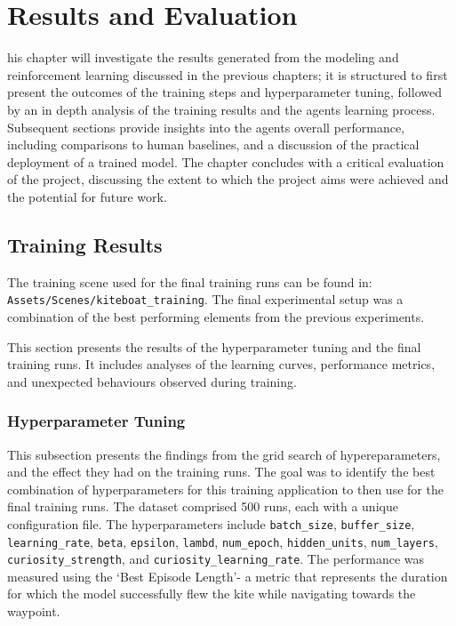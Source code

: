 

\let\textcircled=\pgftextcircled\chapter{Results and Evaluation}\label{chap:results}

his chapter will investigate the results generated from the modeling and reinforcement learning discussed in the previous chapters; it is structured to first present the outcomes of the training steps and hyperparameter tuning, followed by an in depth analysis of the training results and the agents learning process. Subsequent sections provide insights into the agents overall performance, including comparisons to human baselines, and a discussion of the practical deployment of a trained model. The chapter concludes with a critical evaluation of the project, discussing the extent to which the project aims were achieved and the potential for future work.


\section{Training Results}

The training scene used for the final training runs can be found in:
\newline
\texttt{Assets/Scenes/kiteboat\_training}. 
The final experimental setup was a combination of the best performing elements from the previous experiments.

This section presents the results of the hyperparameter tuning and the final training runs. It includes analyses of the learning curves, performance metrics, and unexpected behaviours observed during training.

\subsection{Hyperparameter Tuning}\label{sec:hyperparameter_tuning}

This subsection presents the findings from the grid search of hypereparameters, and the effect they had on the training runs. The goal was to identify the best combination of hyperparameters for this training application to then use for the final training runs. The dataset comprised 500 runs, each with a unique configuration file. The hyperparameters include \texttt{batch\_size}, \texttt{buffer\_size}, \texttt{learning\_rate}, \texttt{beta}, \texttt{epsilon}, \texttt{lambd}, \texttt{num\_epoch}, \texttt{hidden\_units}, \texttt{num\_layers}, \texttt{curiosity\_strength}, and \texttt{curiosity\_learning\_rate}. The performance was measured using the `Best Episode Length'- a metric that represents the duration for which the model successfully flew the kite while navigating towards the waypoint. 

